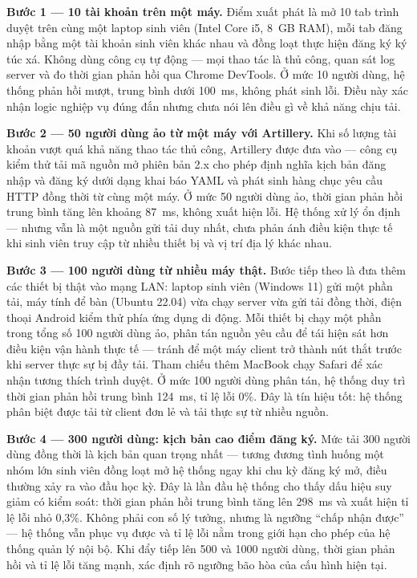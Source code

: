 \documentclass[../DoAn.tex]{subfiles}
\begin{document}
\textbf{Bước 1 --- 10 tài khoản trên một máy.}
Điểm xuất phát là mở 10 tab trình duyệt trên cùng một laptop sinh viên (Intel
Core i5, 8~GB RAM), mỗi tab đăng nhập bằng một tài khoản sinh viên khác nhau và
đồng loạt thực hiện đăng ký ký túc xá. Không dùng công cụ tự động --- mọi thao
tác là thủ công, quan sát log server và đo thời gian phản hồi qua Chrome DevTools.
Ở mức 10 người dùng, hệ thống phản hồi mượt, trung bình dưới 100~ms, không phát
sinh lỗi. Điều này xác nhận logic nghiệp vụ đúng đắn nhưng chưa nói lên điều gì
về khả năng chịu tải.

\textbf{Bước 2 --- 50 người dùng ảo từ một máy với Artillery.}
Khi số lượng tài khoản vượt quá khả năng thao tác thủ công, Artillery được đưa
vào --- công cụ kiểm thử tải mã nguồn mở phiên bản 2.x cho phép định nghĩa kịch
bản đăng nhập và đăng ký dưới dạng khai báo YAML và phát sinh hàng chục yêu cầu
HTTP đồng thời từ cùng một máy. Ở mức 50 người dùng ảo, thời gian phản hồi trung
bình tăng lên khoảng 87~ms, không xuất hiện lỗi. Hệ thống xử lý ổn định --- nhưng
vẫn là một nguồn gửi tải duy nhất, chưa phản ánh điều kiện thực tế khi sinh viên
truy cập từ nhiều thiết bị và vị trí địa lý khác nhau.

\textbf{Bước 3 --- 100 người dùng từ nhiều máy thật.}
Bước tiếp theo là đưa thêm các thiết bị thật vào mạng LAN: laptop sinh viên
(Windows 11) gửi một phần tải, máy tính để bàn (Ubuntu 22.04) vừa chạy server
vừa gửi tải đồng thời, điện thoại Android kiểm thử phía ứng dụng di động. Mỗi
thiết bị chạy một phần trong tổng số 100 người dùng ảo, phân tán nguồn yêu cầu
để tái hiện sát hơn điều kiện vận hành thực tế --- tránh để một máy client trở
thành nút thắt trước khi server thực sự bị đầy tải. Tham chiếu thêm MacBook
chạy Safari để xác nhận tương thích trình duyệt. Ở mức 100 người dùng phân tán,
hệ thống duy trì thời gian phản hồi trung bình 124~ms, tỉ lệ lỗi 0\%. Đây là
tín hiệu tốt: hệ thống phân biệt được tải từ client đơn lẻ và tải thực sự từ
nhiều nguồn.

\textbf{Bước 4 --- 300 người dùng: kịch bản cao điểm đăng ký.}
Mức tải 300 người dùng đồng thời là kịch bản quan trọng nhất --- tương đương tình
huống một nhóm lớn sinh viên đồng loạt mở hệ thống ngay khi chu kỳ đăng ký mở,
điều thường xảy ra vào đầu học kỳ. Đây là lần đầu hệ thống cho thấy dấu hiệu suy
giảm có kiểm soát: thời gian phản hồi trung bình tăng lên 298~ms và xuất hiện
tỉ lệ lỗi nhỏ 0,3\%. Không phải con số lý tưởng, nhưng là ngưỡng ``chấp nhận
được'' --- hệ thống vẫn phục vụ được và tỉ lệ lỗi nằm trong giới hạn cho phép
của hệ thống quản lý nội bộ. Khi đẩy tiếp lên 500 và 1000 người dùng, thời gian
phản hồi và tỉ lệ lỗi tăng mạnh, xác định rõ ngưỡng bão hòa của cấu hình hiện
tại.
\end{document}
